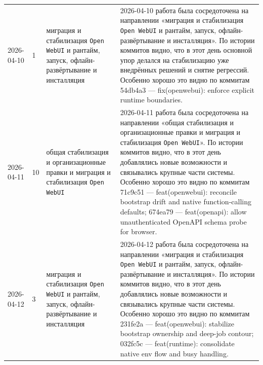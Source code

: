 \begin{longtable}{p{} p{} p{} p{}}
2026-04-10 & 1 & миграция и стабилизация \texttt{Open WebUI} и рантайм, запуск, офлайн-развёртывание и инсталляция & 2026-04-10 работа была сосредоточена на направлении «миграция и стабилизация \texttt{Open WebUI} и рантайм, запуск, офлайн-развёртывание и инсталляция». По истории коммитов видно, что в этот день основной упор делался на стабилизацию уже внедрённых решений и снятие регрессий. Особенно хорошо это видно по коммитам 54db4a3 — fix(openwebui): enforce explicit runtime boundaries. \\
2026-04-11 & 10 & общая стабилизация и организационные правки и миграция и стабилизация \texttt{Open WebUI} & 2026-04-11 работа была сосредоточена на направлении «общая стабилизация и организационные правки и миграция и стабилизация \texttt{Open WebUI}». По истории коммитов видно, что в этот день добавлялись новые возможности и связывались крупные части системы. Особенно хорошо это видно по коммитам 71c9c51 — feat(openwebui): reconcile bootstrap drift and native function-calling defaults; 674ea79 — feat(openapi): allow unauthenticated OpenAPI schema probe for browser. \\
2026-04-12 & 3 & миграция и стабилизация \texttt{Open WebUI} и рантайм, запуск, офлайн-развёртывание и инсталляция & 2026-04-12 работа была сосредоточена на направлении «миграция и стабилизация \texttt{Open WebUI} и рантайм, запуск, офлайн-развёртывание и инсталляция». По истории коммитов видно, что в этот день добавлялись новые возможности и связывались крупные части системы. Особенно хорошо это видно по коммитам 231fe2a — feat(openwebui): stabilize bootstrap ownership and deep-job contour; 032fc5c — feat(runtime): consolidate native env flow and busy handling. \\
\end{longtable}
\endgroup
